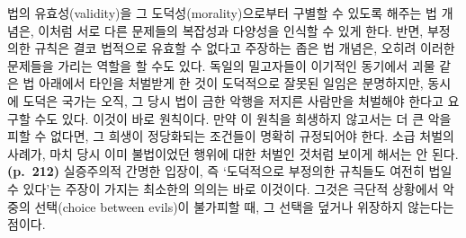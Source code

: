 법의 유효성(validity)을 그 도덕성(morality)으로부터 구별할 수 있도록
해주는 법 개념은, 이처럼 서로 다른 문제들의 복잡성과 다양성을 인식할 수
있게 한다. 반면, 부정의한 규칙은 결코 법적으로 유효할 수 없다고 주장하는
좁은 법 개념은, 오히려 이러한 문제들을 가리는 역할을 할 수도 있다.
독일의 밀고자들이 이기적인 동기에서 괴물 같은 법 아래에서 타인을
처벌받게 한 것이 도덕적으로 잘못된 일임은 분명하지만, 동시에 도덕은
국가는 오직, 그 당시 법이 금한 악행을 저지른 사람만을 처벌해야 한다고
요구할 수도 있다. 이것이 바로  원칙이다. 만약 이 원칙을 희생하지 않고서는 더 큰 악을
피할 수 없다면, 그 희생이 정당화되는 조건들이 명확히 규정되어야 한다.
소급 처벌의 사례가, 마치 당시 이미 불법이었던 행위에 대한 처벌인 것처럼
보이게 해서는 안 된다. \textbf{(p.~212)} 실증주의적 간명한 입장이, 즉
`도덕적으로 부정의한 규칙들도 여전히 법일 수 있다'는 주장이 가지는
최소한의 의의는 바로 이것이다. 그것은 극단적 상황에서 악 중의
선택(choice between evils)이 불가피할 때, 그 선택을 덮거나 위장하지
않는다는 점이다.

\newpage

